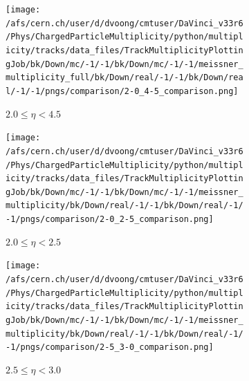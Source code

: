 \begin{figure}[h]
	\begin{subfigure}[h]{0.32\textwidth}
		\texttt{[image: /afs/cern.ch/user/d/dvoong/cmtuser/DaVinci\_v33r6/Phys/ChargedParticleMultiplicity/python/multiplicity/tracks/data\_files/TrackMultiplicityPlottingJob/bk/Down/mc/-1/-1/bk/Down/mc/-1/-1/meissner\_multiplicity\_full/bk/Down/real/-1/-1/bk/Down/real/-1/-1/pngs/comparison/2-0\_4-5\_comparison.png]}
		\caption{$2.0 \le \eta < 4.5$}
		\label{fig: reconstructed track multiplicity measured data-mc comparison 2.0 - 4.5}
	\end{subfigure}
	\begin{subfigure}[h]{0.32\textwidth}
		\texttt{[image: /afs/cern.ch/user/d/dvoong/cmtuser/DaVinci\_v33r6/Phys/ChargedParticleMultiplicity/python/multiplicity/tracks/data\_files/TrackMultiplicityPlottingJob/bk/Down/mc/-1/-1/bk/Down/mc/-1/-1/meissner\_multiplicity/bk/Down/real/-1/-1/bk/Down/real/-1/-1/pngs/comparison/2-0\_2-5\_comparison.png]}
		\caption{$2.0 \le \eta < 2.5$}
		\label{fig: reconstructed track multiplicity measured data-mc comparison 2.0 - 2.5}
	\end{subfigure}
	\begin{subfigure}[h]{0.32\textwidth}
		\texttt{[image: /afs/cern.ch/user/d/dvoong/cmtuser/DaVinci\_v33r6/Phys/ChargedParticleMultiplicity/python/multiplicity/tracks/data\_files/TrackMultiplicityPlottingJob/bk/Down/mc/-1/-1/bk/Down/mc/-1/-1/meissner\_multiplicity/bk/Down/real/-1/-1/bk/Down/real/-1/-1/pngs/comparison/2-5\_3-0\_comparison.png]}
		\caption{$2.5 \le \eta < 3.0$}
		\label{fig: reconstructed track multiplicity measured data-mc comparison 2.5 - 3.0}
	\end{subfigure}
	\begin{subfigure}[h]{0.32\textwidth}

\end{subfigure}
\end{figure}
